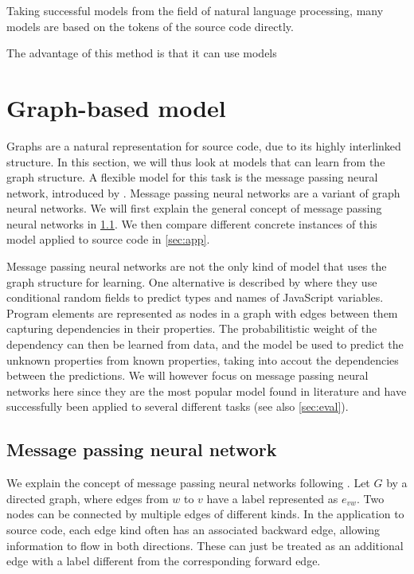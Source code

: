 \documentclass[sigconf,authordraft=true,nonacm=true]{acmart}
\begin{document}
Taking successful models from the field of natural language processing, many models are based on the tokens of the source code directly.

The advantage of this method is that it can use models



\section{Graph-based model}
Graphs are a natural representation for source code, due to its highly interlinked structure.
In this section, we will thus look at models that can learn from the graph structure.
A flexible model for this task is the message passing neural network, introduced by \citet{gilmer_neural_2017}.
Message passing neural networks are a variant of graph neural networks.
We will first explain the general concept of message passing neural networks in \cref{sec:mpnn}.
We then compare different concrete instances of this model applied to source code in \cref{sec:app}.

Message passing neural networks are not the only kind of model that uses the graph structure for learning.
One alternative is described by \citet{raychev_predicting_2019} where they use conditional random fields to predict types and names of JavaScript variables.
Program elements are represented as nodes in a graph with edges between them capturing dependencies in their properties.
The probabilitistic weight of the dependency can then be learned from data, and the model be used to predict the unknown properties from known properties, taking into accout the dependencies between the predictions.
We will however focus on message passing neural networks here since they are the most popular model found in literature and have successfully been applied to several different tasks (see also \cref{sec:eval}).

\subsection{Message passing neural network}\label{sec:mpnn}
We explain the concept of message passing neural networks following \citet{gilmer_neural_2017}.
Let $G$ by a directed graph, where edges from $w$ to $v$ have a label represented as $e_{vw}$.
Two nodes can be connected by multiple edges of different kinds.
In the application to source code, each edge kind often has an associated backward edge, allowing information to flow in both directions.
These can just be treated as an additional edge with a label different from the corresponding forward edge.
\end{document}
